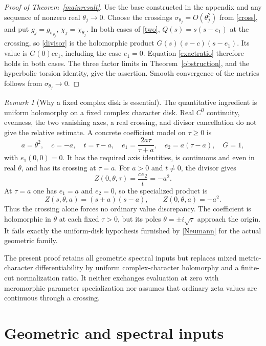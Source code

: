\documentclass[11pt,letterpaper,reqno]{amsart}
\theoremstyle{remark}
\newtheorem{remark}[theorem]{Remark}
\begin{document}
\begin{proof}[Proof of Theorem~\ref{mainresult}]
Use the base constructed in the appendix and any sequence of
nonzero real $\theta_j\to0$. Choose the crossings
$\sigma_{\theta_j}=O(\theta_j^2)$ from \eqref{cross}, and put
$g_j=g_{\sigma_{\theta_j}}$, $\chi_j=\chi_{\theta_j}$.
In both cases of \eqref{two}, $Q(s)=s(s-e_1)$ at the crossing,
so \eqref{divisor} is the holomorphic product
$G(s)(s-c)(s-e_1)$. Its value is $G(0)c e_1$, including the case
$e_1=0$. Equation \eqref{exactratio} therefore holds in both cases.
The three factor limits in Theorem~\ref{obstruction}, and the
hyperbolic torsion identity, give the assertion. Smooth convergence
of the metrics follows from $\sigma_{\theta_j}\to0$.
\end{proof}

\begin{remark}[Why a fixed complex disk is essential]\label{sec:model}
The quantitative ingredient is uniform holomorphy on a fixed complex
character disk. Real $C^0$ continuity, evenness, the two vanishing
axes, a real crossing, and divisor cancellation do not give the relative
estimate. A concrete coefficient model on $\tau\geq0$ is
\[
 a=\theta^2,\quad c=-a,\quad t=\tau-a,\quad
 e_1=\frac{2a\tau}{\tau+a},\quad e_2=a(\tau-a),\quad G=1,
\]
with $e_1(0,0)=0$. It has the required axis identities, is continuous
and even in real $\theta$, and has its crossing at $\tau=a$.
For $a>0$ and $t\ne0$, the divisor gives
\[
 Z(0,\theta,\tau)
   =\frac{c e_2}{t}=-a^2.
\]
At $\tau=a$ one has $e_1=a$ and $e_2=0$, so the specialized product is
\[
 Z(s,\theta,a)=(s+a)(s-a),\qquad Z(0,\theta,a)=-a^2.
\]
Thus the crossing
alone forces no ordinary value discrepancy. The coefficient is
holomorphic in $\theta$ at each fixed $\tau>0$, but its poles
$\theta=\pm i\sqrt\tau$ approach the origin. It fails exactly the
uniform-disk hypothesis furnished by \eqref{Neumann} for the actual
geometric family.

The present proof retains all geometric spectral inputs but replaces
mixed metric-character differentiability by uniform complex-character
holomorphy and a finite-cut normalization ratio. It neither exchanges
evaluation at zero with meromorphic parameter specialization nor assumes
that ordinary zeta values are continuous through a crossing.
\end{remark}

\appendix
\section{Geometric and spectral inputs}\label{app:inputs}
\end{document}

